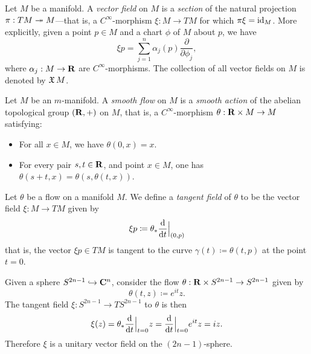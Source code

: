 \begin{definition}
\label{def:vector-field}
Let \(M\) be a manifold. A \emph{vector field} on \(M\) is a \emph{section} of
the natural projection \(\pi: T M \twoheadrightarrow M\)---that is, a \(C^{\infty}\)-morphism
\(\xi: M \to T M\) for which \(\pi \xi = \operatorname{id}_M\). More explicitly, given a point
\(p \in M\) and a chart \(\phi\) of \(M\) about \(p\), we have
\[
\xi p = \sum_{j=1}^n \alpha_j(p) \frac{\partial}{\partial \phi_j},
\]
where \(\alpha_j: M \to \mathbf{R}\) are \(C^{\infty}\)-morphisms. The collection of all
vector fields on \(M\) is denoted by \(\operatorname{\mathfrak{X}} M\).
\end{definition}

\begin{definition}[Flow]
\label{def:flow}
Let \(M\) be an \(m\)-manifold. A \emph{smooth flow} on \(M\) is a \emph{smooth
  action} of the abelian topological group \((\mathbf{R}, +)\) on \(M\), that is, a
\(C^{\infty}\)-morphism \(\theta: \mathbf{R} \times M \to M\) satisfying:
\begin{itemize}\setlength\itemsep{0em}
\item For all \(x \in M\), we have \(\theta(0, x) = x\).
\item For every pair \(s, t \in \mathbf{R}\), and point \(x \in M\), one has
  \(\theta(s + t, x) = \theta(s, \theta(t, x))\).
\end{itemize}
\end{definition}

\begin{definition}
\label{def:tangent-field-to-a-flow}
Let \(\theta\) be a flow on a manifold \(M\). We define a \emph{tangent field}
of \(\theta\) to be the vector field \(\xi: M \to T M\) given by
\[
\xi p \coloneq \theta_{*} \frac{\mathrm{d}}{\mathrm{d} t} \Big|_{(0, p)}
\]
that is, the vector \(\xi p \in T M\) is tangent to the curve \(\gamma(t)
\coloneq \theta(t, p)\) at the point \(t = 0\).
\end{definition}

\begin{example}
\label{exp:unit-vec-field-on-(2n-1)-sphere}
Given a sphere \(S^{2 n - 1} \hookrightarrow \mathbf{C}^n\), consider the flow \(\theta: \mathbf{R} \times
S^{2n-1} \to S^{2n-1}\) given by
\[
\theta(t, z) \coloneq e^{i t} z.
\]
The tangent field \(\xi: S^{2n - 1} \to T S^{2n - 1}\) to \(\theta\) is then
\[
\xi(z) = \theta_{*} \frac{\mathrm{d}}{\mathrm{d} t}\Big|_{t=0} z
= \frac{\mathrm{d}}{\mathrm{d} t}\Big|_{t=0} e^{i t} z
= i z.
\]
Therefore \(\xi\) is a unitary vector field on the \((2n-1)\)-sphere.
\end{example}

